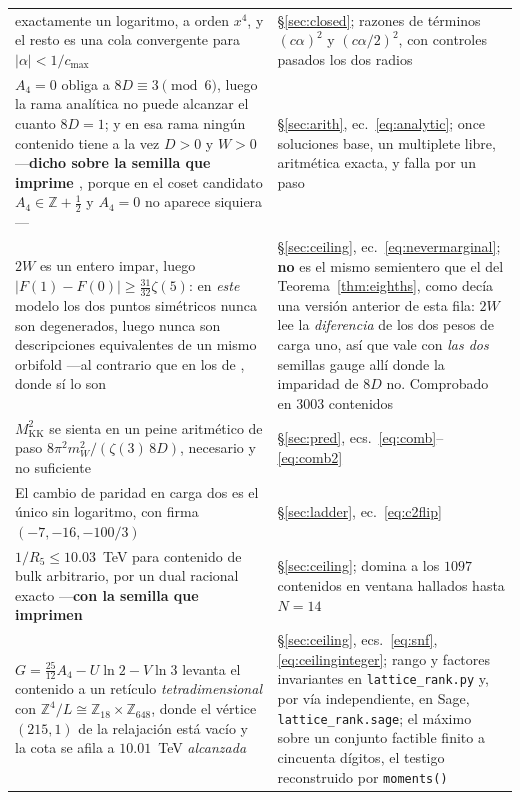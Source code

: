 \documentclass[11pt,a4paper]{article}
\newcommand{\ZZ}{\mathbb{Z}}
\begin{document}
\begin{longtable}{p{}p{}}
exactamente un logaritmo, a orden $x^4$, y el resto es una cola convergente para
$|\alpha|<1/c_{\max}$ & \S\ref{sec:closed}; razones de términos $(c\alpha)^2$ y $(c\alpha/2)^2$, con
controles pasados los dos radios\\
$A_4=0$ obliga a $8D\equiv3\pmod6$, luego la rama analítica no puede alcanzar el cuanto $8D=1$; y en
esa rama ningún contenido tiene a la vez $D>0$ y $W>0$ ---\textbf{dicho sobre la semilla que
imprime \cite{KM25}}, porque en el coset candidato $A_4\in\ZZ+\tfrac12$ y $A_4=0$ no aparece
siquiera--- & \S\ref{sec:arith},
ec.~\eqref{eq:analytic}; once soluciones base, un multiplete libre, aritmética exacta, y falla por
un paso\\
$2W$ es un entero impar, luego $|F(1)-F(0)|\ge\tfrac{31}{32}\zeta(5)$: en \emph{este} modelo los dos
puntos simétricos nunca son degenerados, luego nunca son descripciones equivalentes de un mismo
orbifold ---al contrario que en los de \cite{CCD24}, donde sí lo son &
\S\ref{sec:ceiling}, ec.~\eqref{eq:nevermarginal}; \textbf{no} es el mismo semientero que el del
Teorema~\ref{thm:eighths}, como decía una versión anterior de esta fila: $2W$ lee la
\emph{diferencia} de los dos pesos de carga uno, así que vale con \emph{las dos} semillas gauge
allí donde la imparidad de $8D$ no. Comprobado en $3003$ contenidos\\
$M_{\mathrm{KK}}^2$ se sienta en un peine aritmético de paso $8\pi^2m_W^2/(\zeta(3)\,8D)$, necesario y
no suficiente & \S\ref{sec:pred}, ecs.~\eqref{eq:comb}--\eqref{eq:comb2}\\
El cambio de paridad en carga dos es el único sin logaritmo, con firma $(-7,-16,-100/3)$ &
\S\ref{sec:ladder}, ec.~\eqref{eq:c2flip}\\
$1/R_5\le10.03$~TeV para contenido de bulk arbitrario, por un dual racional exacto ---\textbf{con la semilla que \cite{KM25} imprimen} &
\S\ref{sec:ceiling}; domina a los $1097$ contenidos en ventana hallados hasta $N=14$\\
$G=\tfrac{25}{12}A_4-U\ln2-V\ln3$ levanta el contenido a un retículo \emph{tetradimensional} con
$\ZZ^4/L\cong\ZZ_{18}\times\ZZ_{648}$, donde el vértice $(215,1)$ de la relajación está vacío y la
cota se afila a $10.01$~TeV
\emph{alcanzada} & \S\ref{sec:ceiling}, ecs.~\eqref{eq:snf}, \eqref{eq:ceilinginteger}; rango y
factores invariantes en \texttt{lattice\_\allowbreak rank.py} y, por vía independiente, en Sage,
\texttt{lattice\_\allowbreak rank.sage}; el máximo sobre un conjunto factible finito a cincuenta
dígitos, el testigo reconstruido por \texttt{moments()}\\

\end{longtable}
\end{document}
